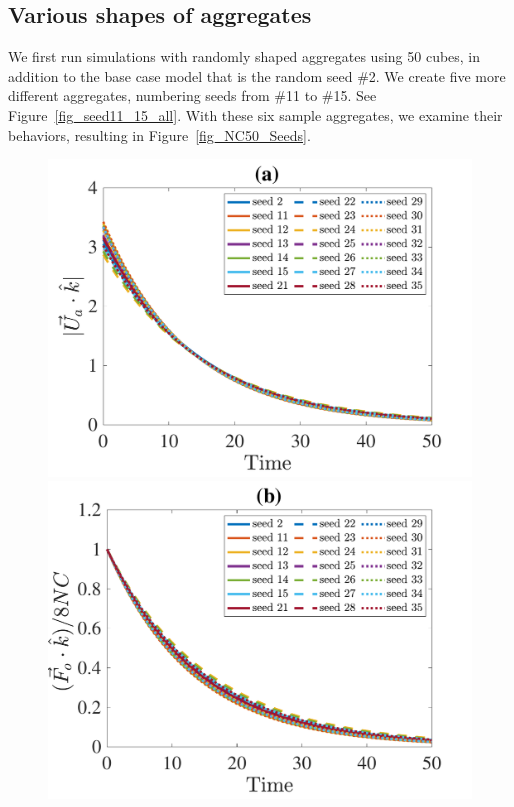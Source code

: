 \subsection{Various shapes of aggregates}
We first run simulations with randomly shaped aggregates using 50 cubes, in addition to the base case model that is the random seed \#2. We create five more different aggregates, numbering seeds from \#11 to \#15. See Figure~\ref{fig_seed11_15_all}.
With these six sample aggregates, we examine their behaviors, resulting in Figure~\ref{fig_NC50_Seeds}.
\begin{figure}[ht]
	\begin{center}
		\includegraphics[scale=0.29]{./figures/fig_NC50_sd_Ua3_all}
		\includegraphics[scale=0.29]{./figures/fig_NC50_sd_Fo3_all}

\end{center}
\end{figure}
